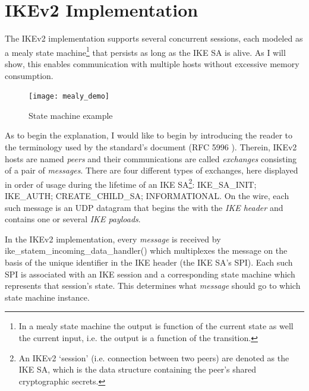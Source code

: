\documentclass[final,a4paper,twoside,11pt,onecolumn]{report}
\begin{document}
% 
% 
% 
% 

\section{IKEv2 Implementation}
The IKEv2 implementation supports several concurrent sessions, each modeled as a mealy state machine\footnote{In a mealy state machine the output is function of the current state as well the current input, i.e. the output is a function of the transition.} that persists as long as the IKE SA is alive. As I will show, this enables communication with multiple hosts without excessive memory consumption.

\begin{figure}[h!]
   \texttt{[image: mealy\_demo]}
   \caption{State machine example}
   \label{fig:mealydemo}
\end{figure}

As to begin the explanation, I would like to begin by introducing the reader to the terminology used by the standard's document (RFC 5996 \cite{rfc5996}). Therein, IKEv2 hosts are named \emph{peers} and their communications are called \emph{exchanges} consisting of a pair of \emph{messages}. There are four different types of exchanges, here displayed in order of usage during the lifetime of an IKE SA\footnote{An IKEv2 `session' (i.e. connection between two peers) are denoted as the IKE SA, which is the data structure containing the peer's shared cryptographic secrets.}: IKE\_SA\_INIT; IKE\_AUTH; CREATE\_CHILD\_SA; INFORMATIONAL. On the wire, each such message is an UDP datagram that begins the with the \emph{IKE header} and contains one or several \emph{IKE payloads}.

In the IKEv2 implementation, every \emph{message} is received by ike\_statem\_incoming\_data\_handler() which multiplexes the message on the basis of the unique identifier in the IKE header (the IKE SA's SPI). Each such SPI is associated with an IKE session and a corresponding state machine which represents that session's state. This determines what \emph{message} should go to which state machine instance.
\end{document}
